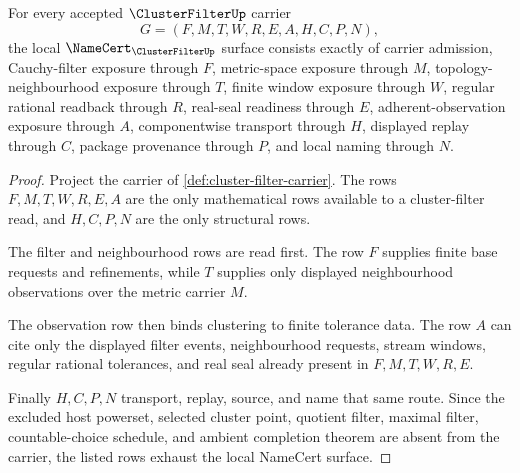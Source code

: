\begin{theorem}
\label{thm:cluster-filter-namecert-obligations}
For every accepted $\ClusterFilterUp$ carrier
$$
G=(F,M,T,W,R,E,A,H,C,P,N),
$$
the local $\NameCert_{\ClusterFilterUp}$ surface consists exactly of carrier admission, Cauchy-filter exposure through $F$, metric-space exposure through $M$, topology-neighbourhood exposure through $T$, finite window exposure through $W$, regular rational readback through $R$, real-seal readiness through $E$, adherent-observation exposure through $A$, componentwise transport through $H$, displayed replay through $C$, package provenance through $P$, and local naming through $N$.
\end{theorem}
\begin{proof}
Project the carrier of \autoref{def:cluster-filter-carrier}. The rows $F,M,T,W,R,E,A$ are the only mathematical rows available to a cluster-filter read, and $H,C,P,N$ are the only structural rows.

The filter and neighbourhood rows are read first. The row $F$ supplies finite base requests and refinements, while $T$ supplies only displayed neighbourhood observations over the metric carrier $M$.

The observation row then binds clustering to finite tolerance data. The row $A$ can cite only the displayed filter events, neighbourhood requests, stream windows, regular rational tolerances, and real seal already present in $F,M,T,W,R,E$.

Finally $H,C,P,N$ transport, replay, source, and name that same route. Since the excluded host powerset, selected cluster point, quotient filter, maximal filter, countable-choice schedule, and ambient completion theorem are absent from the carrier, the listed rows exhaust the local NameCert surface.
\end{proof}

